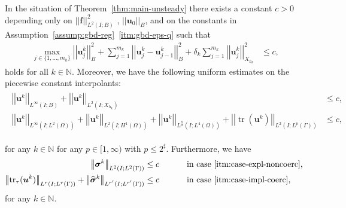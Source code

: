 \documentclass[reqno,a4paper]{amsart}
\def\norm#1{\left|\!\left| #1 \right|\!\right|}
\def\vec#1{\boldsymbol{#1}}
\def\tr{\mathop{\mathrm{tr}}\nolimits}
\def\bf{\vec{f}}
\def\bu{\vec{u}}
\def\bsigma{\vec{\sigma}}
\begin{document}
\begin{lemma}\label{lem:apriori-unst}
	In the situation of Theorem~\ref{thm:main-unsteady} there exists a constant $c>0$ depending only on 
	{$\norm{ \bf}_{L^2(I;B)}^2$}
	, $\norm{ \bu_0}_B$, and on the constants in Assumption~\ref{assump:gbd-reg}~\ref{itm:gbd-eps-q} such that 
	\begin{align}\label{eq:Tabowser}
		\max_{j \in \{ 1, \ldots, m_k \}} \norm{{\bu}^k_j}_B^2  + \sum_{j = 1}^{m_k} \norm{{\bu}^k_j - {\bu}^k_{j-1}}_B^2 
		+  \delta_k \sum_{j = 1}^{m_k}  \norm{\bu_j^k}_{X_{h_k}}^2 
		& \leq c,
	\end{align}
	holds for all $k \in \mathbb{N}$. 
	Moreover, we have the following uniform estimates on the piecewise constant interpolants:
	\begin{align} \label{est:ap-pwconst}
		\begin{split}
			\norm{ \bu^k}_{L^\infty(I;B)}  
			+ 	\norm{ \bu^k}_{L^2(I;X_{h_k})}
			&\leq c,\\
			\norm{ \bu^k}_{L^\infty(I;L^2(\Omega))} 
			+ 	\norm{ \bu^k}_{L^2(I;H^1(\Omega))}
			+	\norm{\bu^k}_{L^{\frac{8}{d}}(I;L^4(\Omega))}
			+ \norm{\tr(\bu^k)}_{L^2(I;L^p(\Gamma))}  
			&\leq c,
		\end{split}
	\end{align}
	
	for any $k \in \mathbb{N}$ for any $p \in [1, \infty)$ with $p \leq 2^\sharp$. 
	Furthermore, we have 
	\begin{alignat*}{2}
		\norm{\bsigma^k}_{L^{2}(I;L^{2}(\Gamma))}  & \leq c \qquad && \text{ in case \ref{itm:case-expl-noncoerc}, } 
		\\
		\norm{\tr_{\tau}(\bu^k)}_{L^{r}(I;L^{r}(\Gamma))} + 		\norm{\widehat{\bsigma}^k}_{L^{r'}(I;L^{r'}(\Gamma))}  & \leq c \qquad && \text{ in case \ref{itm:case-impl-coerc}, }
	\end{alignat*}
	for any $k \in \mathbb{N}$. 
\end{lemma}
\end{document}
